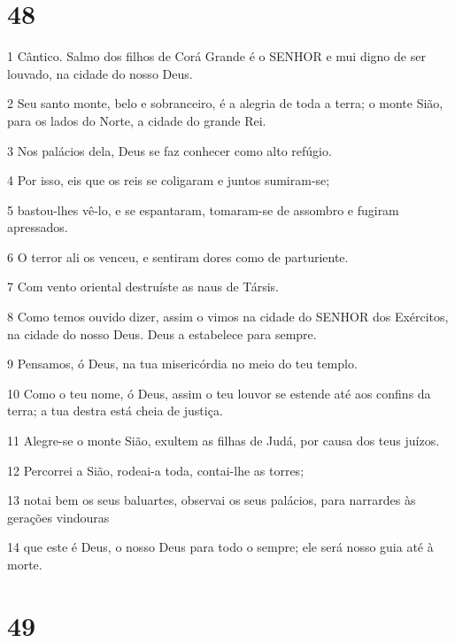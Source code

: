\chapter{48}

\par 1 Cântico. Salmo dos filhos de Corá Grande é o SENHOR e mui digno de ser louvado, na cidade do nosso Deus.
\par 2 Seu santo monte, belo e sobranceiro, é a alegria de toda a terra; o monte Sião, para os lados do Norte, a cidade do grande Rei.
\par 3 Nos palácios dela, Deus se faz conhecer como alto refúgio.
\par 4 Por isso, eis que os reis se coligaram e juntos sumiram-se;
\par 5 bastou-lhes vê-lo, e se espantaram, tomaram-se de assombro e fugiram apressados.
\par 6 O terror ali os venceu, e sentiram dores como de parturiente.
\par 7 Com vento oriental destruíste as naus de Társis.
\par 8 Como temos ouvido dizer, assim o vimos na cidade do SENHOR dos Exércitos, na cidade do nosso Deus. Deus a estabelece para sempre.
\par 9 Pensamos, ó Deus, na tua misericórdia no meio do teu templo.
\par 10 Como o teu nome, ó Deus, assim o teu louvor se estende até aos confins da terra; a tua destra está cheia de justiça.
\par 11 Alegre-se o monte Sião, exultem as filhas de Judá, por causa dos teus juízos.
\par 12 Percorrei a Sião, rodeai-a toda, contai-lhe as torres;
\par 13 notai bem os seus baluartes, observai os seus palácios, para narrardes às gerações vindouras
\par 14 que este é Deus, o nosso Deus para todo o sempre; ele será nosso guia até à morte.

\chapter{49}

